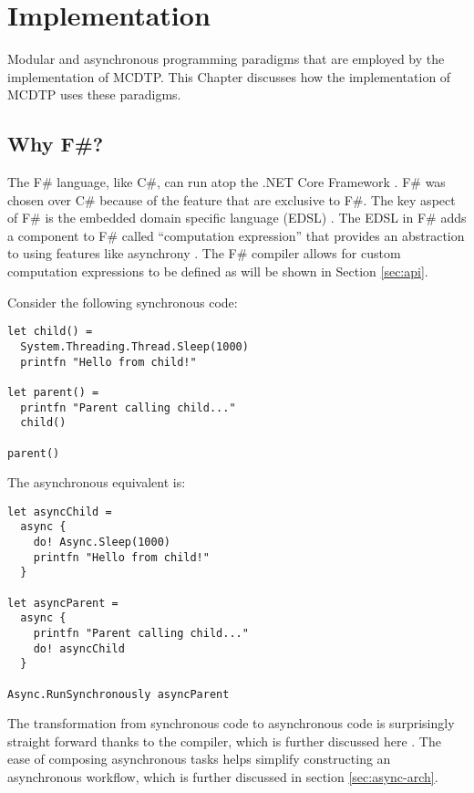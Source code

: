 \chapter{Implementation}\label{chp:impl}

Modular and asynchronous programming paradigms that are employed by the implementation of MCDTP. This Chapter discusses how the implementation of MCDTP uses these paradigms.

\section{Why F\#?}

The F\# language, like C\#, can run atop the .NET Core Framework \cite{Leijen2009}\cite{syme2011f}. F\# was chosen over C\# because of the feature that are exclusive to F\#. The key aspect of F\# is the embedded domain specific language (EDSL) \cite{syme2011f}. The EDSL in F\# adds a component to F\# called ``computation expression'' that provides an abstraction to using features like asynchrony \cite{syme2011f}. The F\# compiler allows for custom computation expressions to be defined as will be shown in Section \ref{sec:api}.

Consider the following synchronous code:

\begin{lstlisting}[caption=Synchronous F\# Example,label={lst:sync}]
let child() =
  System.Threading.Thread.Sleep(1000)
  printfn "Hello from child!"

let parent() =
  printfn "Parent calling child..."
  child()

parent()
\end{lstlisting}

The asynchronous equivalent is:

\begin{lstlisting}[caption=Asynchronous F\# Example,label={lst:async}]
let asyncChild =
  async {
    do! Async.Sleep(1000)
    printfn "Hello from child!"
  }

let asyncParent =
  async {
    printfn "Parent calling child..."
    do! asyncChild
  }

Async.RunSynchronously asyncParent
\end{lstlisting}

The transformation from synchronous code to asynchronous code is surprisingly straight forward thanks to the compiler, which is further discussed here \cite{syme2011f}. The ease of composing asynchronous tasks helps simplify constructing an asynchronous workflow, which is further discussed in section \ref{sec:async-arch}.

